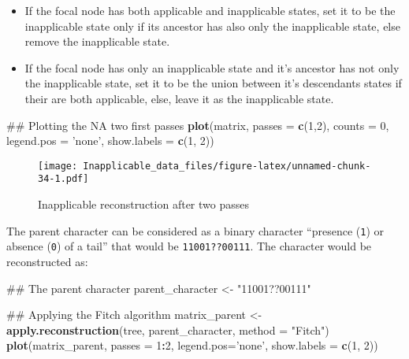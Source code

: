 \documentclass[]{book}
\newenvironment{Shaded}{\begin{snugshade}}{\end{snugshade}}
\newcommand{\KeywordTok}[1]{\textcolor[rgb]{0.13,0.29,0.53}{\textbf{#1}}}
\newcommand{\DataTypeTok}[1]{\textcolor[rgb]{0.13,0.29,0.53}{#1}}
\newcommand{\DecValTok}[1]{\textcolor[rgb]{0.00,0.00,0.81}{#1}}
\newcommand{\StringTok}[1]{\textcolor[rgb]{0.31,0.60,0.02}{#1}}
\newcommand{\OperatorTok}[1]{\textcolor[rgb]{0.81,0.36,0.00}{\textbf{#1}}}
\newcommand{\NormalTok}[1]{#1}
\providecommand{\tightlist}{%
  \setlength{\itemsep}{0pt}\setlength{\parskip}{0pt}}
\theoremstyle{definition}
\theoremstyle{definition}
\theoremstyle{definition}
\theoremstyle{remark}
\begin{document}
\begin{itemize}
\tightlist
\item
  If the focal node has both applicable and inapplicable states, set it
  to be the inapplicable state only if its ancestor has also only the
  inapplicable state, else remove the inapplicable state.
\item
  If the focal node has only an inapplicable state and it's ancestor has
  not only the inapplicable state, set it to be the union between it's
  descendants states if their are both applicable, else, leave it as the
  inapplicable state.
\end{itemize}

\begin{Shaded}
\begin{Highlighting}[]
\NormalTok{## Plotting the NA two first passes}
\KeywordTok{plot}\NormalTok{(matrix, }\DataTypeTok{passes =} \KeywordTok{c}\NormalTok{(}\DecValTok{1}\NormalTok{,}\DecValTok{2}\NormalTok{), }\DataTypeTok{counts =} \DecValTok{0}\NormalTok{, }
     \DataTypeTok{legend.pos =} \StringTok{'none'}\NormalTok{, }\DataTypeTok{show.labels =} \KeywordTok{c}\NormalTok{(}\DecValTok{1}\NormalTok{, }\DecValTok{2}\NormalTok{))}
\end{Highlighting}
\end{Shaded}

\begin{figure}
\centering
\texttt{[image: Inapplicable\_data\_files/figure-latex/unnamed-chunk-34-1.pdf]}
\caption{\label{fig:unnamed-chunk-34}Inapplicable reconstruction after two
passes}
\end{figure}

The parent character can be considered as a binary character ``presence
(\texttt{1}) or absence (\texttt{0}) of a tail'' that would be
\texttt{11001??00111}. The character would be reconstructed as:

\begin{Shaded}
\begin{Highlighting}[]
\NormalTok{## The parent character}
\NormalTok{parent_character <-}\StringTok{ "11001??00111"}

\NormalTok{## Applying the Fitch algorithm}
\NormalTok{matrix_parent <-}\StringTok{ }\KeywordTok{apply.reconstruction}\NormalTok{(tree, parent_character, }\DataTypeTok{method =} \StringTok{"Fitch"}\NormalTok{)}
\KeywordTok{plot}\NormalTok{(matrix_parent, }\DataTypeTok{passes =} \DecValTok{1}\OperatorTok{:}\DecValTok{2}\NormalTok{, }\DataTypeTok{legend.pos=}\StringTok{'none'}\NormalTok{, }\DataTypeTok{show.labels =} \KeywordTok{c}\NormalTok{(}\DecValTok{1}\NormalTok{, }\DecValTok{2}\NormalTok{))}
\end{Highlighting}
\end{Shaded}
\end{document}

